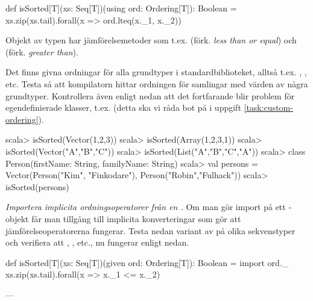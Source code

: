 \begin{CodeSmall}
def isSorted[T](xs: Seq[T])(using ord: Ordering[T]): Boolean =
  xs.zip(xs.tail).forall(x => ord.lteq(x._1, x._2))
\end{CodeSmall}

Objekt av typen  har jämförelsemetoder som t.ex.  (förk. \emph{less than or equal}) och  (förk. \emph{greater than}).

Det finns givna ordningar för alla grundtyper i standardbiblioteket, alltså t.ex. , , etc.
Testa så att kompilatorn hittar ordningen för samlingar med värden av några grundtyper. Kontrollera även enligt nedan att det fortfarande blir problem för egendefinierade klasser, t.ex.   (detta ska vi råda bot på i uppgift \ref{task:custom-ordering}).
\begin{REPL}
scala> isSorted(Vector(1,2,3))
scala> isSorted(Array(1,2,3,1))
scala> isSorted(Vector("A","B","C"))
scala> isSorted(List("A","B","C","A"))
scala> class Person(firstName: String, familyName: String)
scala> val persons = Vector(Person("Kim", "Finkodare"), Person("Robin","Fulhack"))
scala> isSorted(persons)
\end{REPL}

\Subtask \emph{Importera implicita ordningsoperatorer från en .} Om man gör import på ett -objekt får man tillgång till implicita konverteringar som gör att jämförelseoperatorerna fungerar. Testa nedan variant av  på olika sekvenstyper och verifiera att \code{<=}, \code{>}, etc., nu fungerar enligt nedan.
\begin{CodeSmall}
def isSorted[T](xs: Seq[T])(given ord: Ordering[T]): Boolean = {
  import ord._
  xs.zip(xs.tail).forall(x => x._1 <= x._2)
}
\end{CodeSmall}


\SOLUTION


\TaskSolved \what --- \TODO

\QUESTEND







\QUESTBEGIN

\Task \label{task:custom-ordering} \what~


